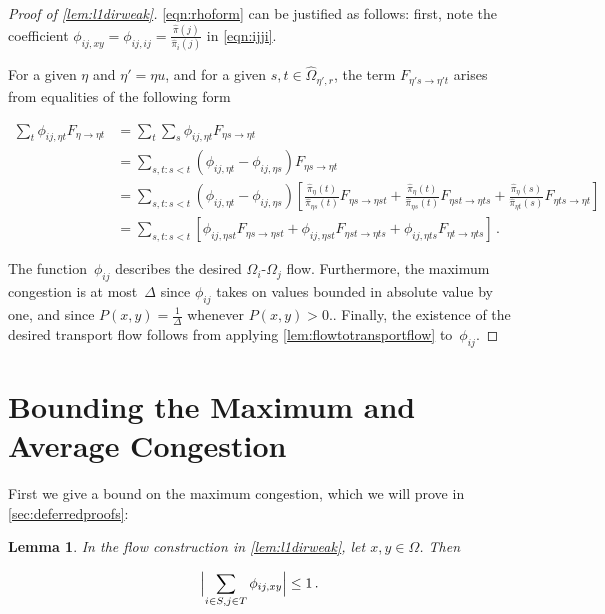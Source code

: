 \documentclass[a4paper, 12p]{article}
\numberwithin{equation}{section}
\newcommand{\Omorproj}{\hat{\Omega}}
\newcommand{\piorproj}{\hat{\pi}}
\newcommand{\flo}[2]{F_{#1 \rightarrow #2}}
\newtheorem{lemma}[theorem]{Lemma}
\begin{document}
\begin{proof}[Proof of \cref{lem:l1dirweak}]
\eqref{eqn:rhoform} can be justified as follows: first, note the coefficient $\phi_{ij,xy} = \phi_{ij,ij} = \frac{\piorproj(j)}{\piorproj_i(j)} $ in \eqref{eqn:ijji}. 

For a given $\eta$ and $\eta' = \eta u$, and for a given $s, t \in \Omorproj_{\eta', r}$, the term $\flo{\eta' s}{\eta' t}$ arises from equalities of the following form

\begin{align}
    \sum_t \phi_{ij,\eta t}\flo{\eta}{\eta t} &= \sum_t\sum_s \phi_{ij,\eta t}\flo{\eta s}{\eta t} \nonumber \\
    &= \sum_{s,t: s < t}(\phi_{ij,\eta t} - \phi_{ij, \eta s})\flo{\eta s}{\eta t} \nonumber \\
    &= \sum_{s,t:s<t}(\phi_{ij,\eta t} - \phi_{ij, \eta s})\left[\frac{\piorproj_{\eta}(t)}{\piorproj_{\eta s}(t)}\flo{\eta s}{\eta s t} + \frac{\piorproj_{\eta}(t)}{\piorproj_{\eta s}(t)}\flo{\eta s t}{\eta t s} + \frac{\piorproj_{\eta}(s)}{\piorproj_{\eta t}(s)}\flo{\eta t s}{\eta t}\right] \nonumber \\
    &= \sum_{s,t: s < t}\left[\phi_{ij,\eta s t}\flo{\eta s}{\eta st} + \phi_{ij,\eta s t}\flo{\eta st}{\eta ts} + \phi_{ij, \eta t s}\flo{\eta t}{\eta t s}\right]\,.
\end{align}

The function~$\phi_{ij}$ describes the desired $\Omega_i$-$\Omega_j$ flow. Furthermore, the maximum congestion is at most~$\Delta$ since $\phi_{ij}$ takes on values bounded in absolute value by one, and since $P(x, y) = \frac{1}{\Delta}$ whenever $P(x, y) > 0$.. Finally, the existence of the desired transport flow follows from applying \cref{lem:flowtotransportflow} to~$\phi_{ij}$.
\end{proof}

\section{Bounding the Maximum and Average Congestion}
\label{sec:avgcond}

First we give a bound on the maximum congestion, which we will prove in \cref{sec:deferredproofs}:

\begin{lemma}
    In the flow construction in \cref{lem:l1dirweak}, let $x,y \in \Omega$. Then
    
    \[
        \Bigl|\sum_{i \in S, j \in T}\phi_{ij,xy}\Bigr| \leq 1\,.
    \]
    \label{lem:maxcong}
\end{lemma}
\end{document}
